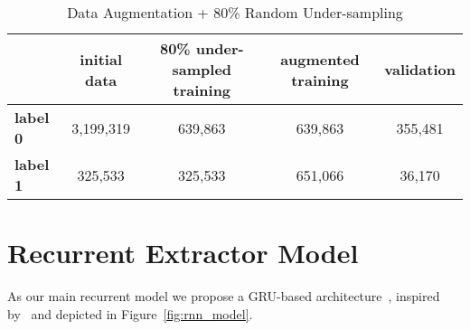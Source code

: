 \begin{enumerate}
    \begin{table}[ht]
        \centering
        \begin{tabular}{lcccc}
        \toprule
            & \textbf{initial data} & \textbf{80\% under-sampled training} & \textbf{augmented training} & \textbf{validation} \\
        \midrule
            \textbf{label 0} & 3,199,319 & 639,863 & 639,863 & 355,481 \\
            \textbf{label 1} & 325,533 & 325,533 & 651,066 & 36,170 \\
        \end{tabular}
        \caption{Data Augmentation + 80\% Random Under-sampling}\label{tab:data_augmentation}
    \end{table}
\end{enumerate}

\newpage

\section{Recurrent Extractor Model}\label{sec:rnn_model}
As our main recurrent model we propose a GRU-based architecture~\cite{cho-etal-2014-learning}, inspired by~\cite{zmandar-etal-2021-joint} and depicted in Figure~\ref{fig:rnn_model}. \\

